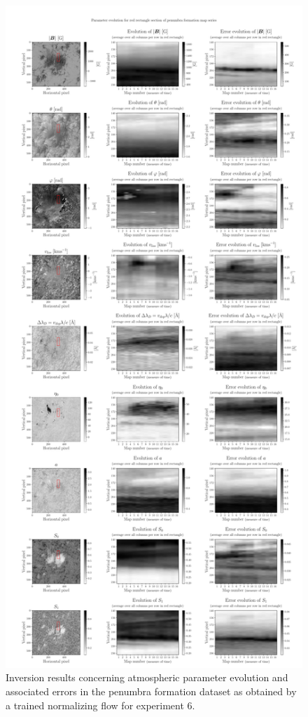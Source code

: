 \documentclass[a4paper,11pt]{report}
\begin{document}
\begin{figure}[h]
\centering
\includegraphics[height=\textheight-1cm]{figures/nf-milne-eddington-example-7-evolution2-nflows-piecewisequadratic.pdf}
\caption{Inversion results concerning atmospheric parameter evolution and associated errors in the penumbra formation dataset as obtained by a trained normalizing flow for experiment 6.}
\label{fig:nf-milne-eddington-example-7-evolution2-nflows-piecewisequadratic}
\end{figure}
\end{document}
